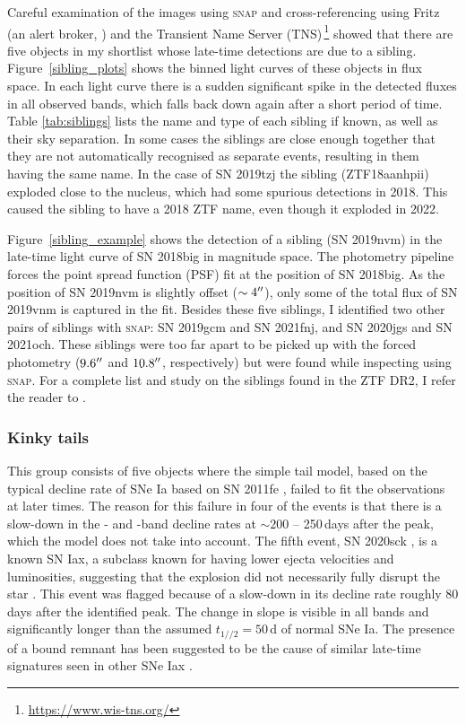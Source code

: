 \documentclass[a4paper,oneside,12pt, class=Latex/Classes/PhDthesisPSnPDF, crop=false]{standalone}
\begin{document}
Careful examination of the images using \textsc{snap} and cross-referencing using Fritz (an alert broker, \citealt{skyportal2019, duev2019realbogus, Kasliwal2019, Skyportal}) and the Transient Name Server (TNS)\,\footnote{\url{https://www.wis-tns.org/}} showed that there are five objects in my shortlist whose late-time detections are due to a sibling. Figure~\ref{sibling_plots} shows the binned light curves of these objects in flux space. In each light curve there is a sudden significant spike in the detected fluxes in all observed bands, which falls back down again after a short period of time. Table \ref{tab:siblings} lists the name and type of each sibling if known, as well as their sky separation. In some cases the siblings are close enough together that they are not automatically recognised as separate events, resulting in them having the same name. In the case of SN 2019tzj the sibling (ZTF18aanhpii) exploded close to the nucleus, which had some spurious detections in 2018. This caused the sibling to have a 2018 ZTF name, even though it exploded in 2022.

Figure~\ref{sibling_example} shows the detection of a sibling (SN 2019nvm) in the late-time light curve of SN 2018big in magnitude space. The photometry pipeline forces the point spread function (PSF) fit at the position of SN 2018big. As the position of SN 2019nvm is slightly offset ($\sim4^{\prime\prime}$), only some of the total flux of SN 2019vnm is captured in the fit. Besides these five siblings, I identified two other pairs of siblings with \textsc{snap}: SN 2019gcm and SN 2021fnj, and SN 2020jgs and SN 2021och. These siblings were too far apart to be picked up with the forced photometry ($9.6^{\prime\prime}$ and $10.8^{\prime\prime}$, respectively) but were found while inspecting using \textsc{snap}. For a complete list and study on the siblings found in the ZTF DR2, I refer the reader to \citet{DR2_siblings}.


\subsubsection{Kinky tails}
\label{kink_tails}
This group consists of five objects where the simple tail model, based on the typical decline rate of SNe Ia based on SN 2011fe \citep{Georgios_11fe}, failed to fit the observations at later times. The reason for this failure in four of the events is that there is a slow-down in the \ztfr- and \ztfi-band decline rates at $\sim200$ -- 250\,days after the peak, which the model does not take into account. The fifth event, SN 2020sck \citep{2020sck_Iax}, is a known SN Iax, a subclass known for having lower ejecta velocities and luminosities, suggesting that the explosion did not necessarily fully disrupt the star \citep{Iax_model_1, Iax_model_2}. This event was flagged because of a slow-down in its decline rate roughly 80 days after the identified peak. The change in slope is visible in all bands and significantly longer than the assumed $t_{1//2} = 50$\,d of normal SNe Ia. The presence of a bound remnant has been suggested to be the cause of similar late-time signatures seen in other SNe Iax \citep{Kawabata_iax14dt, close_Iax, Camacho-Neves_iax14dt}.
\end{document}
